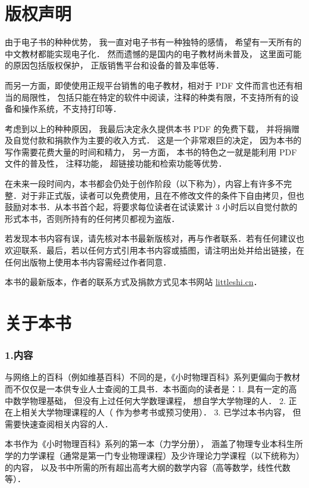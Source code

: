 
\chapter*{版权声明}
由于电子书的种种优势， 我一直对电子书有一种独特的感情， 希望有一天所有的中文教材都能实现电子化． 然而遗憾的是国内的电子教材尚未普及， 这里面可能的原因包括版权保护， 正版销售平台和设备的普及率低等．

而另一方面，即使使用正规平台销售的电子教材，相对于 PDF 文件而言也还有相当的局限性， 包括只能在特定的软件中阅读，注释的种类有限，不支持所有的设备和操作系统，不支持打印等． 

考虑到以上的种种原因， 我最后决定永久提供本书 PDF 的免费下载， 并将捐赠及自觉付款和捐款作为主要的收入方式． 这是一个非常艰巨的决定， 因为本书的写作需要花费大量的时间和精力， 另一方面， 本书的特色之一就是能利用 PDF 文件的普及性， 注释功能， 超链接功能和检索功能等优势．

在未来一段时间内，本书都会仍处于创作阶段（以下称为），内容上有许多不完整．对于非正式版，读者可以免费使用，且在不修改文件的条件下自由拷贝，但也鼓励对本书．从本书首个起，将要求每位读者在试读累计 3 小时后以自觉付款的形式本书，否则所持有的任何拷贝都视为盗版．

若发现本书内容有误，请先核对本书最新版核对，再与作者联系．若有任何建议也欢迎联系．最后，若以任何方式引用本书内容或插图，请注明出处并给出链接，在任何出版物上使用本书内容需经过作者同意．

本书的最新版本，作者的联系方式及捐款方式见本书网站 \href{http://littleshi.cn}{\color{blue}littleshi.cn}．

\chapter*{关于本书}

\subsection{1.内容}

与网络上的百科（例如维基百科）不同的是，《小时物理百科》系列更偏向于教材而不仅仅是一本供专业人士查阅的工具书．本书面向的读者是：1. 具有一定的高中数学物理基础， 但没有上过任何大学数理课程， 想自学大学物理的人． 2. 正在上相关大学物理课程的人（ 作为参考书或预习使用）． 3. 已学过本书内容， 但需要快速查阅相关内容的人．

本书作为《小时物理百科》系列的第一本（力学分册）， 涵盖了物理专业本科生所学的力学课程（通常是第一门专业物理课程）及少许理论力学课程（以下统称为）的内容， 以及书中所需的所有超出高考大纲的数学内容（高等数学，线性代数等）． 

